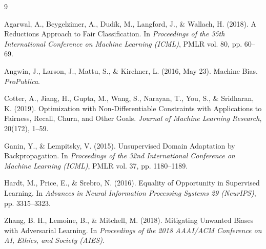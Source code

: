 \documentclass[11pt]{article}
\begin{document}

\begin{thebibliography}{9}

Agarwal, A., Beygelzimer, A., Dudík, M., Langford, J., \& Wallach, H.
(2018). A Reductions Approach to Fair Classification. In
\emph{Proceedings of the 35th International Conference on Machine
Learning (ICML)}, PMLR vol. 80, pp. 60--69.

Angwin, J., Larson, J., Mattu, S., \& Kirchner, L. (2016, May 23).
Machine Bias. \emph{ProPublica}.

Cotter, A., Jiang, H., Gupta, M., Wang, S., Narayan, T., You, S., \&
Sridharan, K. (2019). Optimization with Non-Differentiable Constraints
with Applications to Fairness, Recall, Churn, and Other Goals.
\emph{Journal of Machine Learning Research}, 20(172), 1--59.

Ganin, Y., \& Lempitsky, V. (2015). Unsupervised Domain Adaptation by
Backpropagation. In \emph{Proceedings of the 32nd International
Conference on Machine Learning (ICML)}, PMLR vol. 37, pp. 1180--1189.

Hardt, M., Price, E., \& Srebro, N. (2016). Equality of Opportunity in
Supervised Learning. In \emph{Advances in Neural Information Processing
Systems 29 (NeurIPS)}, pp. 3315--3323.

Zhang, B. H., Lemoine, B., \& Mitchell, M. (2018). Mitigating Unwanted
Biases with Adversarial Learning. In \emph{Proceedings of the 2018
AAAI/ACM Conference on AI, Ethics, and Society (AIES)}.

\end{thebibliography}
\end{document}
